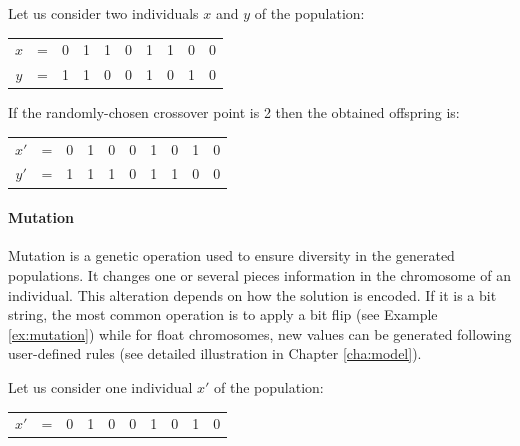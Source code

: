 \begin{example}
\label{ex:crossover}
Let us consider two individuals $x$ and $y$ of the population:
\begin{table}[h!]
\begin{center}
\begin{tabular}{cccccccccc}
$x$ & = & 0 & 1 & 1 & 0 & 1 & 1 & 0 & 0\\
$y$ & = & 1 & 1 & 0 & 0 & 1 & 0 & 1 & 0
\end{tabular}
\end{center}
\end{table}

\noindent
If the randomly-chosen crossover point is 2 then the obtained offspring is:
\begin{table}[h!]
\begin{center}
\begin{tabular}{cccc|cccccc}
$x'$ & = & 0 & 1 & 0 & 0 & 1 & 0 & 1 & 0\\
$y'$ & = & 1 & 1 & 1 & 0 & 1 & 1 & 0 & 0
\end{tabular}
\end{center}
\end{table}
\end{example}

\paragraph{Mutation}
Mutation is a genetic operation used to ensure diversity in the generated populations. It changes one or several pieces information in the chromosome of an individual. This alteration depends on how the solution is encoded. If it is a bit string, the most common operation is to apply a bit flip (see Example \ref{ex:mutation}) while for float chromosomes, new values can be generated following user-defined rules (see detailed illustration in Chapter \ref{cha:model}).

\begin{example}
\label{ex:mutation}
Let us consider one individual $x'$ of the population:
\begin{table}[h!]
\begin{center}
\begin{tabular}{cccccccccc}
$x'$ & = & 0 & 1 & 0 & 0 & 1 & 0 & 1 & 0\\
\end{tabular}
\end{center}
\end{table}
\end{example}


